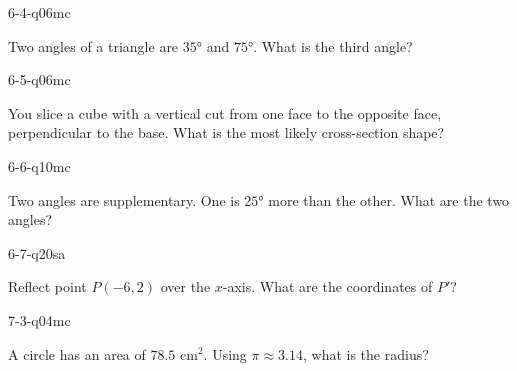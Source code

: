 \begin{practiceQuestion}{6-4-q06}{mc}
\begin{questionText}
Two angles of a triangle are $35°$ and $75°$. What is the third angle?
\end{questionText}
\end{practiceQuestion}

\begin{practiceQuestion}{6-5-q06}{mc}
\begin{questionText}
You slice a cube with a vertical cut from one face to the opposite face, perpendicular to the base. What is the most likely cross-section shape?
\end{questionText}
\end{practiceQuestion}

\begin{practiceQuestion}{6-6-q10}{mc}
\begin{questionText}
Two angles are supplementary. One is $25°$ more than the other. What are the two angles?
\end{questionText}
\end{practiceQuestion}

\begin{practiceQuestion}{6-7-q20}{sa}
\begin{questionText}
Reflect point $P(-6, 2)$ over the $x$-axis. What are the coordinates of $P'$?
\end{questionText}
\end{practiceQuestion}

\begin{practiceQuestion}{7-3-q04}{mc}
\begin{questionText}
A circle has an area of $78.5$ cm$^2$. Using $\pi \approx 3.14$, what is the radius?
\end{questionText}
\end{practiceQuestion}

